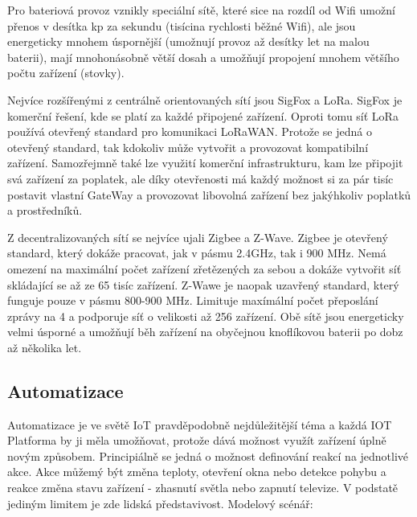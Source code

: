 \documentclass[thesis=B,czech]{FITthesis}[2019/12/23]
\begin{document}
    Pro bateriová provoz vznikly speciální sítě, které sice na rozdíl od Wifi umožní přenos v desítka kp za sekundu (tisícina rychlosti běžné Wifi), ale jsou energeticky mnohem úspornější (umožnují provoz až desítky let na malou baterii), mají mnohonásobně větší dosah a umožňují propojení mnohem většího počtu zařízení (stovky).
    
    Nejvíce rozšířenými z centrálně orientovaných sítí jsou SigFox a LoRa. SigFox je komerční řešení, kde se platí za každé připojené zařízení. Oproti tomu síť LoRa používá otevřený standard pro komunikaci LoRaWAN. Protože se jedná o otevřený standard, tak kdokoliv může vytvořit a provozovat kompatibilní zařízení. Samozřejmně také lze využití komerční infrastrukturu, kam lze připojit svá zařízení za poplatek, ale díky otevřenosti má každý možnost si za pár tisíc postavit vlastní GateWay a provozovat libovolná zařízení bez jakýhkoliv poplatků a prostředníků.

    Z decentralizovaných sítí se nejvíce ujali Zigbee a Z-Wave. Zigbee je otevřený standard, který dokáže pracovat, jak v pásmu 2.4GHz, tak i 900 MHz. Nemá omezení na maximální počet zařízení zřetězených za sebou a dokáže vytvořit síť skládající se až ze 65 tisíc zařízení. Z-Wawe je naopak uzavřený standard, který funguje pouze v pásmu 800-900 MHz. Limituje maxímální počet přeposlání zprávy na 4 a podporuje síť o velikosti až 256 zařízení. Obě sítě jsou energeticky velmi úsporné a umožňují běh zařízení na obyčejnou knoflíkovou baterii po dobz až několika let.

\subsection{Automatizace}
Automatizace je ve světě IoT pravděpodobně nejdůležitější téma a každá IOT Platforma by ji měla umožňovat, protože dává možnost využít zařízení úplně novým způsobem. Principiálně se jedná o možnost definování reakcí na jednotlivé akce. Akce můžemý být změna teploty, otevření okna nebo detekce pohybu a reakce změna stavu zařízení - zhasnutí světla nebo zapnutí televize. V podstatě jediným limitem je zde lidská představivost. Modelový scénář:
\end{document}
